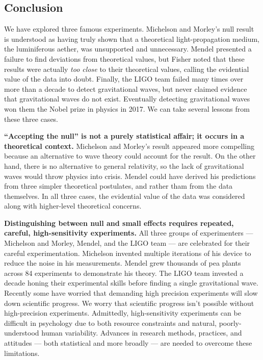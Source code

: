 \documentclass[english,floatsintext,man]{apa6}
\theoremstyle{definition}
\theoremstyle{definition}
\theoremstyle{definition}
\theoremstyle{remark}
\begin{document}
\subsection{Conclusion}\label{conclusion}

We have explored three famous experiments. Michelson and Morley's null
result is understood as having truly shown that a theoretical
light-propagation medium, the luminiferous aether, was unsupported and
unnecessary. Mendel presented a failure to find deviations from
theoretical values, but Fisher noted that these results were actually
\emph{too close} to their theoretical values, calling the evidential
value of the data into doubt. Finally, the LIGO team failed many times
over more than a decade to detect gravitational waves, but never claimed
evidence that gravitational waves do not exist. Eventually detecting
gravitational waves won them the Nobel prize in physics in 2017. We can
take several lessons from these three cases.

\textbf{\enquote{Accepting the null} is not a purely statistical affair;
it occurs in a theoretical context.} Michelson and Morley's result
appeared more compelling because an alternative to wave theory could
account for the result. On the other hand, there is no alternative to
general relativity, so the lack of gravitational waves would throw
physics into crisis. Mendel could have derived his predictions from
three simpler theoretical postulates, and rather tham from the data
themselves. In all three cases, the evidential value of the data was
considered along with higher-level theoretical concerns.

\textbf{Distinguishing between null and small effects requires repeated,
careful, high-sensitivity experiments.} All three groups of
experimenters --- Michelson and Morley, Mendel, and the LIGO team ---
are celebrated for their careful experimentation. Michelson invented
multiple iterations of his device to reduce the noise in his
measurements. Mendel grew thousands of pea plants across 84 experiments
to demonstrate his theory. The LIGO team invested a decade honing their
experimental skills before finding a single gravitational wave. Recently
some have worried that demanding high precision experiments will slow
down scientific progress. We worry that scientific progress isn't
possible without high-precision experiments. Admittedly,
high-sensitivity experiments can be difficult in psychology due to both
resource constraints and natural, poorly-understood human variability.
Advances in research methods, practices, and attitudes --- both
statistical and more broadly --- are needed to overcome these
limitations.
\end{document}
